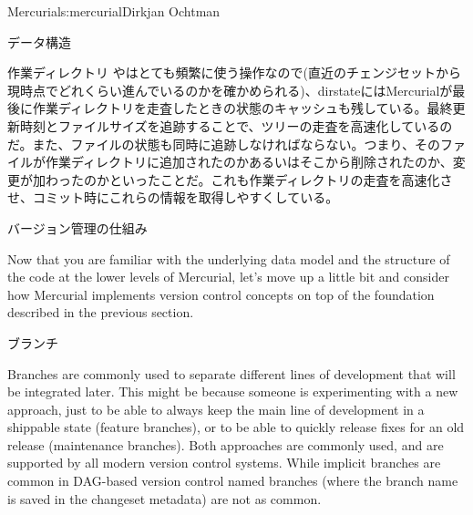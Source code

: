 \begin{aosachapter}{Mercurial}{s:mercurial}{Dirkjan Ochtman}
\begin{aosasect1}{データ構造}
\begin{aosasect2}{作業ディレクトリ}
やはとても頻繁に使う操作なので(直近のチェンジセットから現時点でどれくらい進んでいるのかを確かめられる)、dirstateにはMercurialが最後に作業ディレクトリを走査したときの状態のキャッシュも残している。最終更新時刻とファイルサイズを追跡することで、ツリーの走査を高速化しているのだ。また、ファイルの状態も同時に追跡しなければならない。つまり、そのファイルが作業ディレクトリに追加されたのかあるいはそこから削除されたのか、変更が加わったのかといったことだ。これも作業ディレクトリの走査を高速化させ、コミット時にこれらの情報を取得しやすくしている。

\end{aosasect2}

\end{aosasect1}

\begin{aosasect1}{バージョン管理の仕組み}

Now that you are familiar with the underlying data model and the
structure of the code at the lower levels of Mercurial, let's move up
a little bit and consider how Mercurial implements version control
concepts on top of the foundation described in the previous section.

\begin{aosasect2}{ブランチ}

Branches are commonly used to separate different lines of development
that will be integrated later. This might be because someone is
experimenting with a new approach, just to be able to always keep the
main line of development in a shippable state (feature branches), or
to be able to quickly release fixes for an old release (maintenance
branches). Both approaches are commonly used, and are supported by all
modern version control systems. While implicit branches are common in
DAG-based version control named branches (where the branch name is
saved in the changeset metadata) are not as common.


\end{aosasect2}
\end{aosasect1}
\end{aosachapter}
